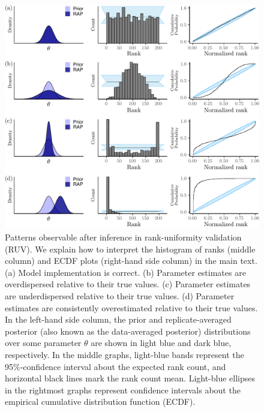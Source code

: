 \documentclass[oneside]{article}
\begin{document}
\begin{figure}
  \includegraphics[width=\linewidth]{../figures/sbc_conceptual_manual.pdf}
  \caption{
    Patterns observable after inference in rank-uniformity validation (RUV).
    We explain how to interpret the histogram of ranks (middle column) and ECDF plots (right-hand side column) in the main text.
    (a) Model implementation is correct.
    (b) Parameter estimates are overdispersed relative to their true values.
    (c) Parameter estimates are underdispersed relative to their true values.
    (d) Parameter estimates are consistently overestimated relative to their true values.
    In the left-hand side column, the prior and replicate-averaged posterior (also known as the data-averaged posterior) distributions over some parameter $\theta$ are shown in light blue and dark blue, respectively.
    In the middle graphs, light-blue bands represent the 95\%-confidence interval about the expected rank count, and horizontal black lines mark the rank count mean.
    Light-blue ellipses in the rightmost graphs represent confidence intervals about the empirical cumulative distribution function (ECDF).
  }
  \label{fig:ruv_conceptual}
\end{figure}
\end{document}
